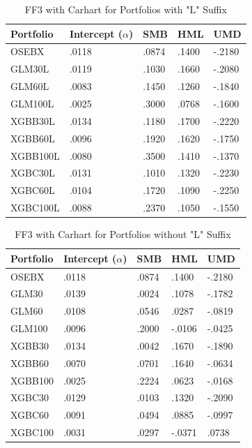 \begin{table}[H]
\centering
\begin{tabularx}{\textwidth}{lXXXX}
\toprule
Portfolio & Intercept ($\alpha$) & SMB & HML & UMD \\
\midrule
OSEBX  & .0118 & .0874 & .1400 & -.2180 \\
\midrule
GLM30L   & .0119 & .1030 & .1660 & -.2080 \\ 
GLM60L   & .0083 & .1450 & .1260 & -.1840 \\ 
GLM100L  & .0025 & .3000 & .0768 & -.1600 \\ 
XGBB30L  & \cellcolor{lightlightgreen} .0134 & .1180 & .1700 & -.2220 \\ 
XGBB60L  & .0096 & .1920 & .1620 & -.1750 \\ 
XGBB100L & .0080 & .3500 & .1410 & -.1370 \\ 
XGBC30L  & .0131 & .1010 & .1320 & -.2230 \\ 
XGBC60L  & .0104 & .1720 & .1090 & -.2250 \\ 
XGBC100L & .0088 & .2370 & .1050 & -.1550 \\ 
\bottomrule
\end{tabularx}
\vspace{1em}
\caption{FF3 with Carhart for Portfolios with "L" Suffix}
\label{tab:new-famafrench-trading-l-suffix}
\end{table}

\begin{table}[H]
\centering
\begin{tabularx}{\textwidth}{lXXXX}
\toprule
Portfolio & Intercept ($\alpha$) & SMB & HML & UMD \\
\midrule
OSEBX  & .0118 & .0874 & .1400 & -.2180 \\
\midrule
GLM30  & \cellcolor{lightlightgreen} .0139 & .0024 & .1078 & -.1782 \\ 
GLM60  & .0108 & .0546 & .0287 & -.0819 \\ 
GLM100 & .0096 & .2000 & -.0106 & -.0425 \\ 
XGBB30 & .0134 & .0042 & .1670 & -.1890 \\ 
XGBB60 & .0070 & .0701 & .1640 & -.0634 \\ 
XGBB100& .0025 & .2224 & .0623 & -.0168 \\ 
XGBC30 & .0129 & .0103 & .1320 & -.2090 \\ 
XGBC60 & .0091 & .0494 & .0885 & -.0997 \\ 
XGBC100& .0031 & .0297 & -.0371 & .0738 \\ 
\bottomrule
\end{tabularx}
\vspace{1em}
\caption{FF3 with Carhart for Portfolios without "L" Suffix}
\label{tab:new-famafrench-trading-no-l-suffix}
\end{table}



